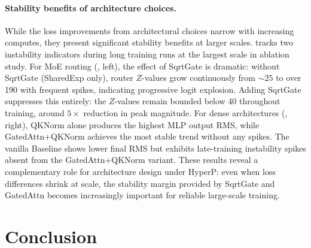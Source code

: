 \documentclass{article}
\begin{document}
\paragraph{Stability benefits of architecture choices.}
While the loss improvements from architectural choices narrow with increasing computes, they present significant stability benefits at larger scales.  tracks two instability indicators during long training runs at the largest scale in ablation study. For MoE routing (, left), the effect of SqrtGate is dramatic: without SqrtGate (SharedExp only), router $Z$-values grow continuously from ${\sim}25$ to over 190 with frequent spikes, indicating progressive logit explosion. Adding SqrtGate suppresses this entirely: the $Z$-values remain bounded below 40 throughout training, around $5{\times}$ reduction in peak magnitude. For dense architectures (, right), QKNorm alone produces the highest MLP output RMS, while GatedAttn+QKNorm achieves the most stable trend without any spikes. The vanilla Baseline shows lower final RMS but exhibits late-training instability spikes absent from the GatedAttn+QKNorm variant. These results reveal a complementary role for architecture design under HyperP: even when loss differences shrink at scale, the stability margin provided by SqrtGate and GatedAttn becomes increasingly important for reliable large-scale training.



\section{Conclusion}\label{sec:conclusion}
\end{document}
